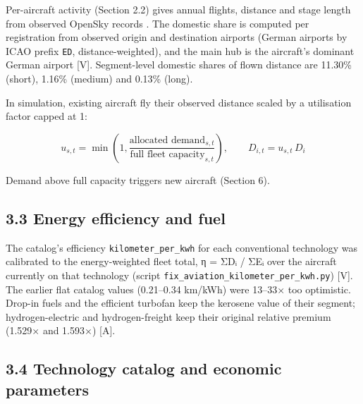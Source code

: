 \documentclass[11pt,a4paper]{article}
\begin{document}
Per-aircraft activity (Section 2.2) gives annual flights, distance and stage length from observed OpenSky records \citep{schafer2014}. The domestic share is computed per registration from observed origin and destination airports (German airports by ICAO prefix \texttt{ED}, distance-weighted), and the main hub is the aircraft's dominant German airport [V]. Segment-level domestic shares of flown distance are 11.30\% (short), 1.16\% (medium) and 0.13\% (long).

In simulation, existing aircraft fly their observed distance scaled by a utilisation factor capped at 1:

\[
u_{s,t} = \min\!\left(1, \frac{\text{allocated demand}_{s,t}}{\text{full fleet capacity}_{s,t}}\right), \qquad D_{i,t} = u_{s,t} \, D_i
\]

Demand above full capacity triggers new aircraft (Section 6).

\subsection*{3.3 Energy efficiency and fuel}

The catalog's efficiency \texttt{kilometer\_\allowbreak{}per\_\allowbreak{}kwh} for each conventional technology was calibrated to the energy-weighted fleet total, η = ΣDᵢ / ΣEᵢ over the aircraft currently on that technology (script \texttt{fix\_\allowbreak{}aviation\_\allowbreak{}kilometer\_\allowbreak{}per\_\allowbreak{}kwh.\allowbreak{}py}) [V]. The earlier flat catalog values (0.21–0.34 km/kWh) were 13–33× too optimistic. Drop-in fuels and the efficient turbofan keep the kerosene value of their segment; hydrogen-electric and hydrogen-freight keep their original relative premium (1.529× and 1.593×) [A].

\subsection*{3.4 Technology catalog and economic parameters}
\end{document}
